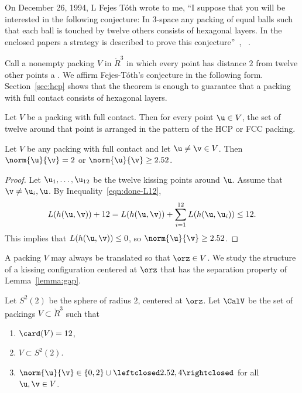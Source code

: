 On December 26, 1994, L Fejes T\'oth wrote to me, ``I suppose that you will
be interested in the following conjecture: In $3$-space any packing of
equal balls such that each ball is touched by twelve others consists
of hexagonal layers.  In the enclosed papers a strategy is described
to prove this conjecture''~\cite{Fejes-Toth:89},
~\cite{Fejes-Toth:69}.

Call a nonempty packing $V$ in $\ring{R}^3$ in which every point has
distance $2$ from twelve other points a .  We affirm Fejes-T\'oth's conjecture
in the following form.  Section~\ref{sec:hcp} shows that the theorem
is enough to guarantee that a packing with full contact consists of
hexagonal layers.  
%
%


\begin{theorem}\label{thm:fc} 
  Let $V$ be a packing with full contact.  Then for every point $\u\in
  V$, the set of twelve around that point is arranged in the pattern
  of the HCP or FCC packing.
\end{theorem}
%
%
%



\begin{lemma}[] \label{lemma:gap}
  Let $V$ be any packing with full contact and let $\u\ne\v\in V$.
  Then $\norm{\u}{\v}=2$ or $\norm{\u}{\v} \ge 2.52$.
\end{lemma}
%
%

\begin{proof} Let $ \u_1,\ldots, \u_{12}$ be the twelve kissing points
  around $\u$.  Assume that $\v\ne \u_i,\u$.  By
  Inequality~\ref{eqn:done-L12},
\[
   L(h( \u, \v))  + 12 
  =  L(h( \u, \v)) + \sum_{i=1}^{12} L(h( \u, \u_i))  \le 12.
\]
This implies that $L(h( \u, \v))\le 0$, so $\norm{ \u}{ \v}\ge 2.52$.
\end{proof}

A packing $V$ may always be translated so that $\orz\in V$.  We study
the structure of a kissing configuration centered at $\orz$ that
has the separation property of Lemma~\ref{lemma:gap}.

\begin{definition}[$S^2(2)$,~$\CalV$]
  Let $S^2(2)$ be the sphere of radius $2$, centered at $\orz$.  Let
  $\CalV$ be the set of packings $V\subset \ring{R}^3$ such that
\begin{enumerate}\wasitemize 
\item $\card(V) = 12$,
\item $V\subset S^2(2)$.
\item $\norm{\u}{\v} \in \{0,2\}\cup
  \leftclosed2.52,4\rightclosed$ for all $\u,\v\in V$.
\end{enumerate}\wasitemize 
{}%
%
\end{definition}

